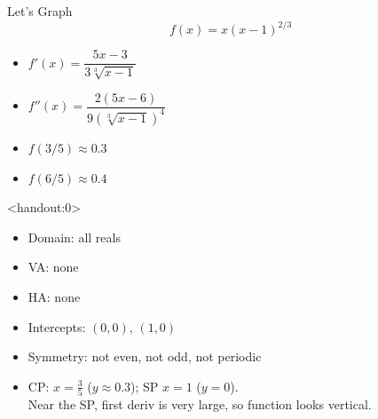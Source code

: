 \begin{frame}[t]{Let's Graph}
\AnswerYes{}
\[f(x)=x(x-1)^{2/3}\]
\vfill
\begin{itemize}
\item[\textbullet] $f'(x)=\dfrac{5x-3}{3\sqrt[3]{x-1}}$
\item[\textbullet] $f''(x)=\dfrac{2(5x-6)}{9(\sqrt[3]{x-1})^4}$
\pause\vfill
\item $f(3/5)\approx 0.3$
\item $f(6/5)\approx 0.4$
\end{itemize}
\end{frame}
\begin{frame}<handout:0>
\color{answercolor}
\begin{itemize}\color{answercolor}
\item Domain: all reals
\item VA: none
\item HA: none
\item Intercepts: $(0,0)$, $(1,0)$
\item Symmetry: not even, not odd, not periodic
\item CP: $x=\frac35$ ($y\approx 0.3$); SP $x=1$ ($y=0$).\\ 
   Near the SP, first deriv is very large, so function looks vertical.
\end{itemize}
\end{frame}

